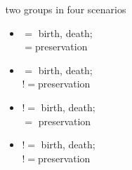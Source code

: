 \documentclass{beamer}
\begin{document}
\begin{frame}
\begin{columns}
\begin{column}{0.5\textwidth}
\begin{center}
        \tiny{}
      \end{center}
    \end{column}
    \begin{column}{0.5\textwidth}
      two groups in four scenarios
      \begin{itemize}
        \item \(=\) birth, death; \\\(=\)preservation
        \item \(=\) birth, death; \\\(!=\)preservation
        \item \(!=\) birth, death; \\\(=\) preservation
        \item \(!=\) birth, death; \\\(!=\)preservation
      \end{itemize}
    \end{column}
  \end{columns}
\end{frame}
\end{document}
